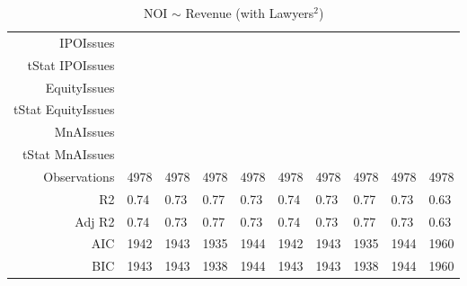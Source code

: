 \begin{table}[ht]
\begin{tabular}{rlllllllll}
  IPOIssues &  &  &  &  &  &  &  &  &  \\ 
  tStat IPOIssues &  &  &  &  &  &  &  &  &  \\ 
  EquityIssues &  &  &  &  &  &  &  &  &  \\ 
  tStat EquityIssues &  &  &  &  &  &  &  &  &  \\ 
  MnAIssues &  &  &  &  &  &  &  &  &  \\ 
  tStat MnAIssues &  &  &  &  &  &  &  &  &  \\ 
  Observations & 4978 & 4978 & 4978 & 4978 & 4978 & 4978 & 4978 & 4978 & 4978 \\ 
  R2 & 0.74 & 0.73 & 0.77 & 0.73 & 0.74 & 0.73 & 0.77 & 0.73 & 0.63 \\ 
  Adj R2 & 0.74 & 0.73 & 0.77 & 0.73 & 0.74 & 0.73 & 0.77 & 0.73 & 0.63 \\ 
  AIC & 1942 & 1943 & 1935 & 1944 & 1942 & 1943 & 1935 & 1944 & 1960 \\ 
  BIC & 1943 & 1943 & 1938 & 1944 & 1943 & 1943 & 1938 & 1944 & 1960 \\ 
   \hline
\end{tabular}
\caption{NOI $\sim$ Revenue (with Lawyers$^2$)} 
\end{table}
